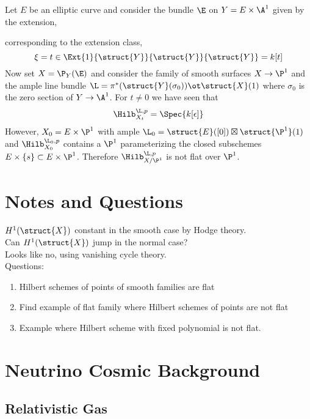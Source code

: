 \documentclass[12pt]{article}
\begin{document}
\begin{example}
Let $E$ be an elliptic curve and consider the bundle $\E$ on $Y = E \times \A^1$ given by the extension,
\begin{center}
\end{center}
corresponding to the extension class,
\[ \xi = t \in \Ext{1}{\struct{Y}}{\struct{Y}}{\struct{Y}} = k[t] \]
Now set $X = \P_Y(\E)$ and consider the family of smooth surfaces $X \to \P^1$ and the ample line bundle $\L = \pi^* (\struct{Y}(\sigma_0)) \ot \struct{X}(1)$ where $\sigma_0$ is the zero section of $Y \to \A^1$. For $t \neq 0$ we have seen that \[ \Hilb^{\L, p}_{X_t} = \Spec{k[\epsilon]} \]
However, $X_0 = E \times \P^1$ with ample $\L_0 = \struct{E}([0]) \boxtimes \struct{\P^1}(1)$ and $\Hilb^{\L_0, p}_{X_0}$ contains a $\P^1$ parameterizing the closed subschemes $E \times \{ s \} \subset E \times \P^1$. Therefore $\Hilb^{\L, p}_{X/\P^1}$ is not flat over $\P^1$.
\end{example}


\section{Notes and Questions}

$H^1(\struct{X})$ constant in the smooth case by Hodge theory. 
\bigskip\\
Can $H^1(\struct{X})$ jump in the normal case?
\bigskip\\
Looks like no, using vanishing cycle theory. 
\bigskip\\
Questions:

\begin{enumerate}
\item Hilbert schemes of points of smooth families are flat
\item Find example of flat family where Hilbert schemes of points are not flat
\item Example where Hilbert scheme with fixed polynomial is not flat.
\end{enumerate}

\section{Neutrino Cosmic Background}

\subsection{Relativistic Gas}
\end{document}
